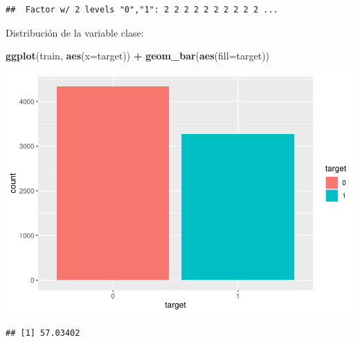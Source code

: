 \documentclass[
]{article}
\newenvironment{Shaded}{\begin{snugshade}}{\end{snugshade}}
\newcommand{\DataTypeTok}[1]{\textcolor[rgb]{0.13,0.29,0.53}{#1}}
\newcommand{\DecValTok}[1]{\textcolor[rgb]{0.00,0.00,0.81}{#1}}
\newcommand{\KeywordTok}[1]{\textcolor[rgb]{0.13,0.29,0.53}{\textbf{#1}}}
\newcommand{\NormalTok}[1]{#1}
\newcommand{\OperatorTok}[1]{\textcolor[rgb]{0.81,0.36,0.00}{\textbf{#1}}}
\newcommand{\StringTok}[1]{\textcolor[rgb]{0.31,0.60,0.02}{#1}}
\begin{document}
\begin{verbatim}
##  Factor w/ 2 levels "0","1": 2 2 2 2 2 2 2 2 2 2 ...
\end{verbatim}

Distribución de la variable clase:

\begin{Shaded}
\begin{Highlighting}[]
\KeywordTok{ggplot}\NormalTok{(train, }\KeywordTok{aes}\NormalTok{(}\DataTypeTok{x=}\NormalTok{target)) }\OperatorTok{+}\StringTok{ }
\StringTok{  }\KeywordTok{geom_bar}\NormalTok{(}\KeywordTok{aes}\NormalTok{(}\DataTypeTok{fill=}\NormalTok{target))}
\end{Highlighting}
\end{Shaded}

\begin{center}\includegraphics{exercise_files/figure-latex/unnamed-chunk-6-1} \end{center}

\begin{Shaded}
\end{Shaded}

\begin{verbatim}
## [1] 57.03402
\end{verbatim}

\begin{Shaded}
\end{Shaded}
\end{document}
